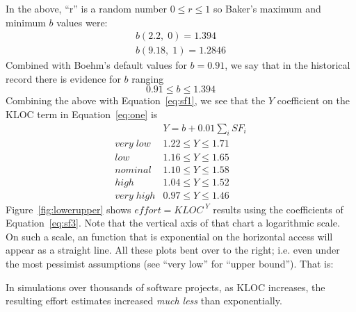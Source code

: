\documentclass[final,twocolumn]{elsarticle}
\newcommand{\fig}[1]{Figure~\ref{fig:#1}}
\newcommand{\eq}[1]{Equation~\ref{eq:#1}}
\theoremstyle{break}
\begin{document}
In the  above,  ``r'' is a random number $0 \le r \le 1$ so Baker's maximum and minimum $b$ values
were:
\[
\begin{array}{c}
b(2.2,\; 0) = 1.394\\
b(9.18,\; 1) =1.2846
\end{array}
\]
Combined with Boehm's default values for $b=0.91$, we say that in the historical record
there is evidence for $b$ ranging
\begin{equation}\label{eq:sf2}
0.91 \le b \le 1.394
\end{equation}
Combining the above with \eq{sf1}, we see that the $Y$ coefficient on the 
KLOC term in \eq{one} is 
\begin{equation}\label{eq:sf3} 
\begin{array}{r|l}
                  &  Y= b + 0.01 \sum_i SF_i \\\hline
\mathit{very\; low} &  1.22 \le Y \le 1.71\\
\mathit{  low} &  1.16 \le Y \le 1.65 \\
\mathit{nominal}& 1.10 \le Y \le 1.58    \\
\mathit{high} &  1.04 \le Y \le 1.52  \\
\mathit{very\; high} & 0.97 \le Y \le 1.46   
\end{array}
\end{equation} 
\fig{lowerupper} shows   $\mathit{effort} = \mathit{KLOC}^{\;Y}$ results using the coefficients
of \eq{sf3}. Note that the vertical axis of that chart a logarithmic scale.
On such a scale, an function that is exponential on the horizontal access will
appear as a straight line. All these plots bent over to the right; i.e. even
under the most pessimist  assumptions (see ``very low'' for ``upper bound''). That is:

\begin{lesson}
  In simulations over thousands of software projects,
  as KLOC increases, the resulting effort estimates increased {\em much less} than exponentially.
\end{lesson}
\end{document}
